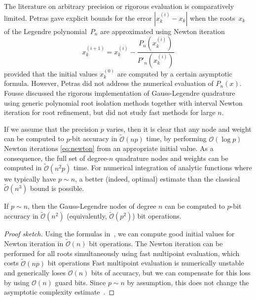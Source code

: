 \documentclass{siamart0216}
\newcommand{\OO}{\mathcal{O}}
\newcommand{\OOtilde}{\widetilde{\mathcal{O}}}
\begin{document}
The literature on arbitrary precision or rigorous evaluation
is comparatively limited.
Petras \cite{petras1999computation} gave explicit
bounds for the error $|x_k^{(i)} - x_k|$ when
the roots $x_k$ of the Legendre polynomial $P_n$
are approximated using Newton iteration
\begin{equation}
\label{eq:newton}
x^{(i+1)}_k = x^{(i)}_k - \frac{P_n(x^{(i)}_k)}{P'_n(x^{(i)}_k)}
\end{equation}
provided that the initial values $x^{(0)}_k$
are computed by a certain asymptotic formula.
However, Petras did not address the numerical evaluation of $P_n(x)$.
Fousse \cite{fousse2007accurate} discussed the rigorous implementation
of Gauss-Legendre quadrature
using generic polynomial root isolation methods together with
interval Newton iteration
for root refinement,
but did not study fast methods for large $n$.

If we assume that the precision $p$ varies,
then it is clear that any node and weight
can be computed to $p$-bit accuracy in $\OOtilde(n p)$ time,
by performing $\OO(\log p)$ Newton iterations \eqref{eq:newton}
from an appropriate initial value.
As a consequence, the
full set of degree-$n$ quadrature nodes and weights
can be computed in $\OOtilde(n^2 p)$ time.
For numerical integration of analytic functions
where we typically have $p \sim n$, a better (indeed, optimal) estimate
than the classical $\OOtilde(n^3)$ bound is possible.

\begin{theorem}
\label{thm:complexity}
If $p \sim n$, then the Gauss-Legendre nodes of degree $n$ can be computed to
$p$-bit accuracy in $\OOtilde(n^2)$ (equivalently, $\OOtilde(p^2)$) bit operations.
\end{theorem}

\begin{proof}[Proof sketch]
Using the formulas in~\cite{petras1999computation},
we can compute good initial values for Newton iteration
in $\OOtilde(n)$ bit operations.
The Newton iteration can be performed for all roots
simultaneously using fast multipoint evaluation, which costs
$\OOtilde(n p)$ bit operations%
Fast multipoint evaluation is numerically unstable and
generically loses $\OO(n)$ bits of accuracy, but we can compensate for
this loss by using $\OO(n)$ guard bits.
Since $p \sim n$ by assumption, this does not change the asymptotic complexity estimate~\cite{kobel2013fast}.

\end{proof}
\end{document}
